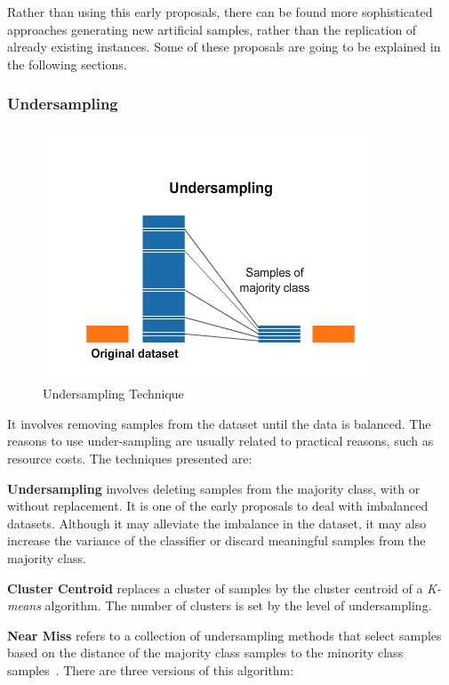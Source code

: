 Rather than using this early proposals, there can be found more sophisticated 
approaches generating new artificial samples, rather than the replication of 
already existing instances. Some of these proposals are going to be explained in 
the following sections. 

\subsubsection{Undersampling}\label{sec:undersampling}

\begin{figure}[h!]
\centering
\includegraphics[width=.7\textwidth]{figures/Undersampling.png}
\caption{Undersampling Technique \cite{OverUnderIbm2019}}
\label{fig:undersampling}
\end{figure}

It involves removing samples from the dataset until the data
is balanced. The reasons to use under-sampling are usually related to practical 
reasons, such as resource costs. The techniques presented are:

\textbf{Undersampling} involves deleting samples from the majority class, with 
or 
without replacement. It is one of the early proposals to deal with imbalanced 
datasets. Although it may alleviate the imbalance in the dataset, it may also 
increase the variance of the classifier or discard meaningful samples from the 
majority class.

\textbf{Cluster Centroid} replaces a cluster of samples by the cluster centroid 
of a \textit{K-means} algorithm. The number of clusters is set by the level of 
undersampling.

\textbf{Near Miss}\label{nearmiss} refers to a collection of undersampling 
methods that select samples based on the distance of the majority class samples 
to the minority class samples~\cite{Zhang03}. There are three versions of this 
algorithm: 

